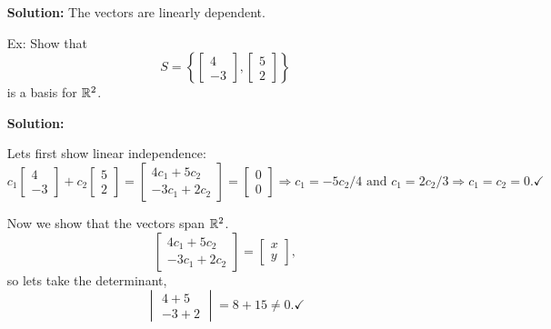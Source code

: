 \documentclass[reqno]{amsart}
\theoremstyle{definition}
\begin{document}
\begin{enumerate}
\textbf{Solution:  }  The vectors are linearly dependent.

\item[Ex:  ]  Show that
%
\begin{equation*}
S = \left\lbrace\begin{bmatrix}
4\\
-3
\end{bmatrix}, \begin{bmatrix}
5\\
2
\end{bmatrix}\right\rbrace
\end{equation*}
%
is a basis for $\mathbb{R}^2$.

\textbf{Solution:  }

Lets first show linear independence:
%
\begin{equation*}
c_1\begin{bmatrix}
4\\
-3
\end{bmatrix} + c_2\begin{bmatrix}
5\\
2
\end{bmatrix} = \begin{bmatrix}
4c_1 + 5c_2\\
-3c_1 + 2c_2
\end{bmatrix} = \begin{bmatrix}
0\\
0
\end{bmatrix} \Rightarrow c_1 = -5c_2/4 \text{  and  } c_1 = 2c_2/3 \Rightarrow c_1 = c_2 = 0.
\checkmark
\end{equation*}
%

Now we show that the vectors span $\mathbb{R}^2$.
%
\begin{equation*}
\begin{bmatrix}
4c_1 + 5c_2\\
-3c_1 + 2c_2
\end{bmatrix} = \begin{bmatrix}
x\\
y
\end{bmatrix},
\end{equation*}
%
so lets take the determinant,
%
\begin{equation*}
\begin{vmatrix}
4 + 5\\
-3 + 2
\end{vmatrix} = 8 + 15 \neq 0. \checkmark
\end{equation*}

\pagebreak


\end{enumerate}
\end{document}
